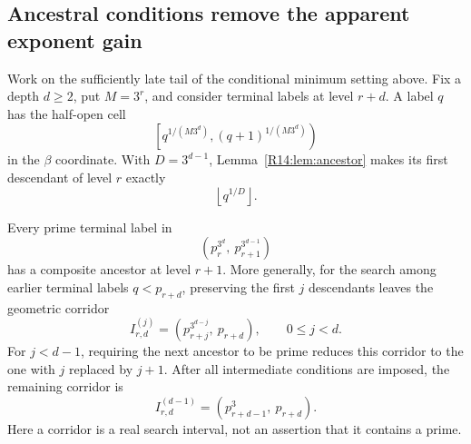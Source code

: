 \documentclass[11pt,a4paper]{article}
\theoremstyle{definition}\newtheorem{definition}[theorem]{Definition}
\theoremstyle{remark}\newtheorem{remark}[theorem]{Remark}
\newcommand{\floor}[1]{\left\lfloor#1\right\rfloor}
\begin{document}
\subsection{Ancestral conditions remove the apparent exponent gain}

Work on the sufficiently late tail of the conditional minimum
setting above. Fix a depth $d\ge2$, put $M=3^r$, and consider
terminal labels at level $r+d$. A label $q$ has the half-open cell
\[
 \left[q^{1/(M3^d)},(q+1)^{1/(M3^d)}\right)
\]
in the $\beta$ coordinate. With $D=3^{d-1}$,
Lemma~\ref{R14:lem:ancestor} makes its first descendant of level $r$
exactly
\begin{equation}\label{R14:eq:first-ancestor}
 \floor{q^{1/D}}.
\end{equation}

\begin{proposition}\label{R14:prop:corridor}
Every prime terminal label in
\begin{equation}\label{R14:eq:forbidden-raw}
 (p_r^{3^d},\ p_{r+1}^{3^{d-1}})
\end{equation}
has a composite ancestor at level $r+1$. More generally, for the
search among earlier terminal labels $q<p_{r+d}$, preserving the
first $j$ descendants leaves the geometric corridor
\begin{equation}\label{R14:eq:corridors}
 I_{r,d}^{(j)}=(p_{r+j}^{3^{d-j}},\ p_{r+d}),
 \qquad 0\le j<d.
\end{equation}
For $j<d-1$, requiring the next ancestor to be prime reduces this
corridor to the one with $j$ replaced by $j+1$. After all intermediate
conditions are imposed, the remaining corridor is
\begin{equation}\label{R14:eq:final-corridor}
 I_{r,d}^{(d-1)}=(p_{r+d-1}^3,\ p_{r+d}).
\end{equation}
Here a corridor is a real search interval, not an assertion that
it contains a prime.
\end{proposition}
\end{document}

